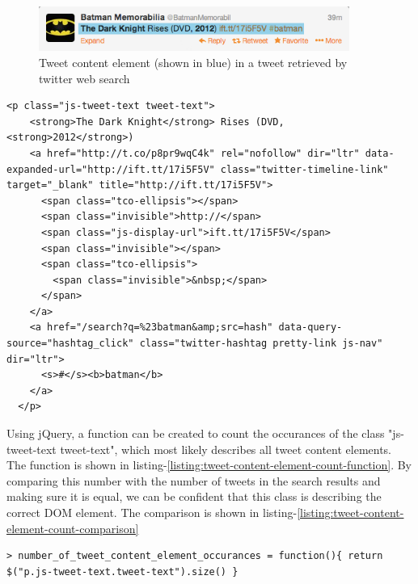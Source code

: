   \begin{figure}[H]
\includegraphics[width=4in]{image/tweet-text-and-url-field.png}
\centering
\caption{Tweet content element (shown in blue) in a tweet retrieved by twitter web search}
\label{figure:tweet-text-field}
\end{figure}

\begin{lstlisting}[caption={HTML of the tweet content element in a tweet},label={listing:tweet-content-element-html},captionpos=b]
  <p class="js-tweet-text tweet-text">
    <strong>The Dark Knight</strong> Rises (DVD, <strong>2012</strong>)
    <a href="http://t.co/p8pr9wqC4k" rel="nofollow" dir="ltr" data-expanded-url="http://ift.tt/17i5F5V" class="twitter-timeline-link" target="_blank" title="http://ift.tt/17i5F5V">
      <span class="tco-ellipsis"></span>
      <span class="invisible">http://</span>
      <span class="js-display-url">ift.tt/17i5F5V</span>
      <span class="invisible"></span>
      <span class="tco-ellipsis">
        <span class="invisible">&nbsp;</span>
      </span>
    </a>
    <a href="/search?q=%23batman&amp;src=hash" data-query-source="hashtag_click" class="twitter-hashtag pretty-link js-nav" dir="ltr">
      <s>#</s><b>batman</b>
    </a>
  </p>
\end{lstlisting}

\noindent
Using jQuery, a function can be created to count the occurances of the class "js-tweet-text tweet-text", which most likely describes all tweet content elements. The function is shown in listing-\ref{listing:tweet-content-element-count-function}. By comparing this number with the number of tweets in the search results and making sure it is equal, we can be confident that this class is describing the correct DOM element. The comparison is shown in
listing-\ref{listing:tweet-content-element-count-comparison}

\begin{lstlisting}[caption={Creating a function in GCDT Javascript Console for counting the occurance of tweet content elements on the twitter search result page},label={listing:tweet-content-element-count-function},captionpos=b]
  > number_of_tweet_content_element_occurances = function(){ return $("p.js-tweet-text.tweet-text").size() }
\end{lstlisting}

